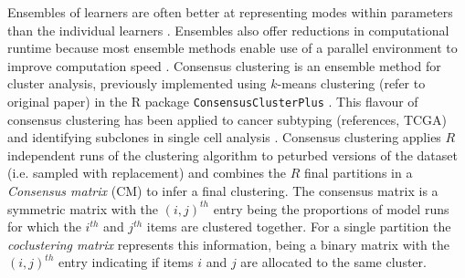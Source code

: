 \documentclass{bioinfo}
\begin{document}
%

Ensembles of learners are often better at representing modes within parameters than the individual learners \cite{ghaemi2011review}. Ensembles also offer reductions in computational runtime because most ensemble methods enable use of a parallel environment to improve computation speed \cite{ghaemi2009survey}. Consensus clustering \cite{monti2003consensus} is an ensemble method for cluster analysis, previously implemented using $k$-means clustering (refer to original paper) in the R package \texttt{ConsensusClusterPlus} \cite{wilkerson2010consensusclusterplus}. This flavour of consensus clustering has been applied to cancer subtyping (references, TCGA) and identifying subclones in single cell analysis \cite{kiselev2017sc3}. Consensus clustering applies $R$ independent runs of the clustering algorithm to peturbed versions of the dataset (i.e. sampled with replacement) and combines the $R$ final partitions in a \emph{Consensus matrix} (CM) to infer a final clustering. The consensus matrix is a symmetric matrix with the $(i, j)^{th}$ entry being the proportions of model runs for which the $i^{th}$ and $j^{th}$ items are clustered together. For a single partition the \emph{coclustering matrix} represents this information, being a binary matrix with the $(i, j)^{th}$ entry indicating if items $i$ and $j$ are allocated to the same cluster.
\end{document}
